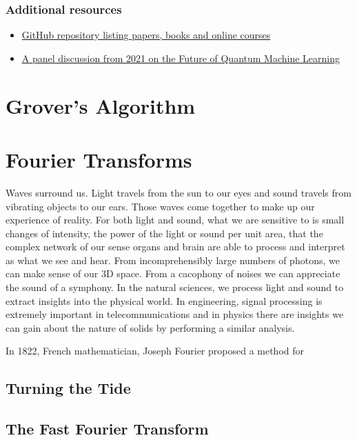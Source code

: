\documentclass{book}
\begin{document}
\subsection{Additional resources}
\begin{itemize}
    \item \href{https://github.com/Christophe-pere/Roadmap-to-QML}{GitHub repository listing papers, books and online courses}
    \item \href{https://www.youtube.com/watch?v=5UsJV2BNj2U&list=PLOFEBzvs-VvppIb0jg5_aDbmFs36DXD9w}{A panel discussion from 2021 on the Future of Quantum Machine Learning}
\end{itemize}

\chapter{Grover's Algorithm}

\chapter{Fourier Transforms} 


\vspace{3cm}

Waves surround us. Light travels from the sun to our eyes and sound travels from vibrating objects to our ears. Those waves come together to make up our experience of reality. For both light and sound, what we are sensitive to is small changes of intensity, the power of the light or sound per unit area, that the complex network of our sense organs and brain are able to process and interpret as what we see and hear. From incomprehensibly large numbers of photons, we can make sense of our 3D space. From a cacophony of noises we can appreciate the sound of a symphony. In the natural sciences, we process light and sound to extract insights into the physical world. In engineering, signal processing is extremely important in telecommunications and in physics there are insights we can gain about the nature of solids by performing a similar analysis. 

In 1822, French mathematician, Joseph Fourier proposed a method for 

\section{Turning the Tide}


\section{The Fast Fourier Transform}
\end{document}
